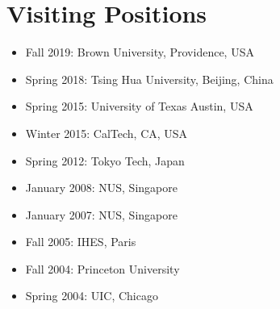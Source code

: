 \documentclass[11pt,a4paper]{article}
\begin{document}
\section*{Visiting Positions}
\begin{itemize}
    \item Fall 2019: Brown University, Providence, USA
    \item Spring 2018: Tsing Hua University, Beijing, China
    \item Spring 2015: University of Texas Austin, USA
    \item Winter 2015: CalTech, CA, USA
    \item Spring 2012: Tokyo Tech, Japan
    \item January 2008: NUS, Singapore
    \item January 2007: NUS, Singapore
    \item Fall 2005: IHES, Paris
    \item Fall 2004: Princeton University
    \item Spring 2004: UIC, Chicago
\end{itemize}
\end{document}
